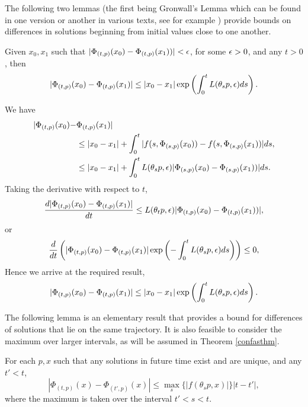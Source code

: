 The following two lemmas (the first being Gronwall's Lemma which can be found in
one version or another in various texts, see for example \cite{Pe91}) provide
bounds on differences in solutions beginning from initial values close to one
another.

\begin{lemma}
\label{intro2lem}
Given $x_0, x_1$ such that $|\Phi_{(t, p)}(x_0) - \Phi_{(t, p)}(x_1))| <
\epsilon$, for some $\epsilon > 0$, and any $t > 0$, then
\[ | \Phi_{(t, p)}(x_0) - \Phi_{(t, p)}(x_{1} ) | \leq |x_{0} - x_{1}|
\exp\left( \int_{0}^{t} L(\theta_{s} p, \epsilon) ds\right). \]
\end{lemma}
\begin{prf}
We have
\begin{align*}
| \Phi_{(t, p)}(x_0) - &\Phi_{(t, p)}(x_{1} ) |  \\
  &\leq |x_0 - x_1| + \int_0^t
       |f(s, \Phi_{(s, p)}(x_0)) - f(s, \Phi_{(s, p)}(x_1))| ds, \\
  &\leq |x_0 - x_1| + \int_0^t L(\theta_{s} p, \epsilon)|\Phi_{(s, p)}(x_0) -
            \Phi_{(s, p)}(x_1))| ds. \\
\end{align*}
Taking the derivative with respect to $t$,
\[  \frac{d|\Phi_{(t, p)}(x_0) - \Phi_{(t, p)}(x_{1} ) |}{dt} \leq
      L(\theta_{t}p,\epsilon)|\Phi_{(t, p)}(x_0)  - \Phi_{(t, p)}(x_1))|, \]
or
\[  \frac{d}{dt} \left(|\Phi_{(t, p)}(x_0) - \Phi_{(t, p)}(x_{1} ) | \exp\left(
   - \int_{0}^{t} L(\theta_{s} p, \epsilon) ds\right) \right) \leq 0, \]
Hence we arrive at the required result,
\[ | \Phi_{(t, p)}(x_0) - \Phi_{(t, p)}(x_{1} ) | \leq |x_{0} - x_{1}|
           \exp\left( \int_{0}^{t} L(\theta_{s} p, \epsilon) ds\right). \]
\end{prf}

The following lemma is an elementary result that provides a bound for
differences of solutions that lie on the same trajectory. It is also
feasible to consider the maximum over larger intervals, as will be assumed
in Theorem \ref{confasthm}.

\begin{lemma}
\label{intro3lem}
For each $p, x$ such that any solutions in future time exist and are unique,
and any $t' < t$,
\[  | \Phi_{(t, p)}(x) - \Phi_{(t', p)}(x) | \leq \max_s \{ |f(\theta_s p, x)|
  \} |t - t'|, \]
where the maximum is taken over the interval $t' < s < t$.
\end{lemma}


\endinput
